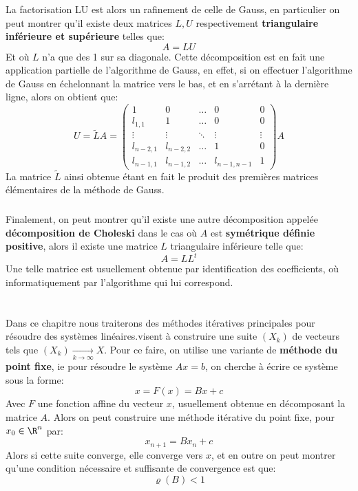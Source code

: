\subsection*{}
La factorisation LU est alors un rafinement de celle de Gauss, en particulier on peut montrer qu'il existe deux matrices \( L, U \) respectivement \textbf{triangulaire inférieure et supérieure} telles que:
\[ 
   A = LU 
\]
Et où \( L \) n'a que des 1 sur sa diagonale. Cette décomposition est en fait une application partielle de l'algorithme de Gauss, en effet, si on effectuer l'algorithme de Gauss en échelonnant la matrice vers le bas, et en s'arrétant à la dernière ligne, alors on obtient que:
\[ 
   U = \widetilde{L}A = \begin{pmatrix}
   1 & 0 & \ldots & 0 & 0\\
   l_{1,1} & 1 & \ldots & 0 & 0 \\
   \vdots &  \vdots &  \ddots & \vdots &  \vdots \\
   l_{n-2,1} & l_{n-2,2} & \ldots & 1 & 0\\
   l_{n-1,1} & l_{n-1,2} & \ldots & l_{n-1,n-1} & 1
   \end{pmatrix} A
\]
La matrice \( \widetilde{L} \) ainsi obtenue étant en fait le produit des premières matrices élémentaires de la méthode de Gauss.


\subsection*{}
Finalement, on peut montrer qu'il existe une autre décomposition appelée \textbf{décomposition de Choleski} dans le cas où \( A \) est \textbf{symétrique définie positive}, alors il existe une matrice \( L \) triangulaire inférieure telle que:
\[ 
   A = LL^t 
\]
Une telle matrice est usuellement obtenue par identification des coefficients, où informatiquement par l'algorithme qui lui correspond.
\chapter*{}
Dans ce chapitre nous traiterons des méthodes itératives principales pour résoudre des systèmes linéaires.visent à construire une suite \((X_k)\) de vecteurs tels que \((X_k) \underset{k \rightarrow \infty}{\longrightarrow} X\). Pour ce faire, on utilise une variante de \textbf{méthode du point fixe}, ie pour résoudre le système \( Ax = b \), on cherche à écrire ce système sous la forme:
\[ 
   x = F(x) = Bx + c
\]
Avec \( F \) une fonction affine du vecteur \( x \), usuellement obtenue en décomposant la matrice \( A \). Alors on peut construire une méthode itérative du point fixe, pour \( x_0 \in \R^n \) par:
\[ 
   x_{n+1} = Bx_n +c 
\]
Alors si cette suite converge, elle converge vers \( x \), et en outre on peut montrer qu'une condition nécessaire et suffisante de convergence est que:
\[ 
   \varrho(B) < 1 
\]
